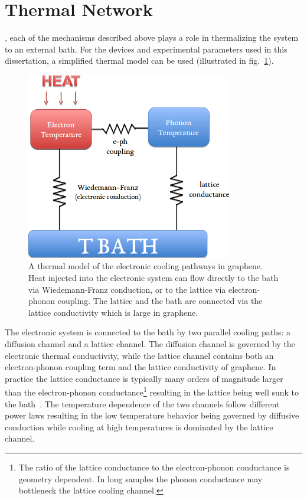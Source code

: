 \section{Thermal Network}
, each of the mechanisms described above plays a role in thermalizing the system to an external bath. For the devices and experimental parameters used in this dissertation, a simplified thermal model can be used (illustrated in fig.~\ref{fig:thermal_diagram}).
\begin{figure}
\centering
\includegraphics[width = 90mm]{figures/electronic_cooling/Thermal_diagram.png}
\caption{A thermal model of the electronic cooling pathways in graphene. Heat injected into the electronic system can flow directly to the bath via Wiedemann-Franz conduction, or to the lattice via electron-phonon coupling. The lattice and the bath are connected via the lattice conductivity which is large in graphene.}
\label{fig:thermal_diagram}
\end{figure}
The electronic system is connected to the bath by two parallel cooling paths: a diffusion channel and a lattice channel. The diffusion channel is governed by the electronic thermal conductivity, while the lattice channel contains both an electron-phonon coupling term and the lattice conductivity of graphene. In practice the lattice conductance is typically many orders of magnitude larger than the electron-phonon conductance\footnote{The ratio of the lattice conductance to the electron-phonon conductance is geometry dependent. In long samples the phonon conductance may bottleneck the lattice cooling channel.} resulting in the lattice being well sunk to the bath~\cite{crossno_development_2015,fong_measurement_2013, seol_two-dimensional_2010}. The temperature dependence of the two channels follow different power laws resulting in the low temperature behavior being governed by diffusive conduction while cooling at high temperatures is dominated by the lattice channel.

